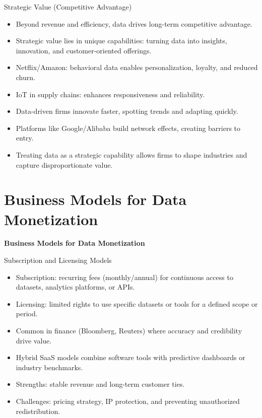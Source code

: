 \documentclass[aspectratio=169, table]{beamer}
\begin{document}
	\begin{frame}{Strategic Value (Competitive Advantage)}
		\vspace{20pt}
		\begin{itemize}
			\item Beyond revenue and efficiency, data drives long-term competitive advantage.
			\item Strategic value lies in unique capabilities: turning data into insights, innovation, and customer-oriented offerings.
			\item Netflix/Amazon: behavioral data enables personalization, loyalty, and reduced churn.
			\item IoT in supply chains: enhances responsiveness and reliability.
			\item Data-driven firms innovate faster, spotting trends and adapting quickly.
			\item Platforms like Google/Alibaba build network effects, creating barriers to entry.
			\item Treating data as a strategic capability allows firms to shape industries and capture disproportionate value.
		\end{itemize}
	\end{frame}
	
	\section{Business Models for Data Monetization}
	
	\begin{frame}{\hfill}
		\centering
		\Huge{\textbf{Business Models for Data Monetization}}
	\end{frame}
	
	\begin{frame}{Subscription and Licensing Models}
		\begin{itemize}
			\item Subscription: recurring fees (monthly/annual) for continuous access to datasets, analytics platforms, or APIs.  
			\item Licensing: limited rights to use specific datasets or tools for a defined scope or period.  
			\item Common in finance (Bloomberg, Reuters) where accuracy and credibility drive value.  
			\item Hybrid SaaS models combine software tools with predictive dashboards or industry benchmarks.  
			\item Strengths: stable revenue and long-term customer ties.  
			\item Challenges: pricing strategy, IP protection, and preventing unauthorized redistribution.  
		\end{itemize}
	\end{frame}
	
\end{document}
